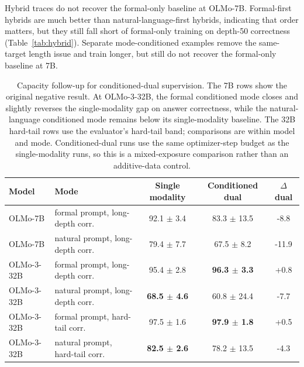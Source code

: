\documentclass[11pt]{article}
\begin{document}
Hybrid traces do not recover the formal-only baseline at OLMo-7B. Formal-first
hybrids are much better than natural-language-first hybrids, indicating that
order matters, but they still fall short of formal-only training on depth-50
correctness (Table~\ref{tab:hybrid}). Separate mode-conditioned examples
remove the same-target length issue and train longer, but still do not recover
the formal-only baseline at 7B.

\begin{table}[t]
\centering
\scriptsize
\begin{tabular}{llccc}
\toprule
Model & Mode & Single modality & Conditioned dual & $\Delta$ dual \\
\midrule
OLMo-7B & formal prompt, long-depth corr. & 92.1 $\pm$ 3.4 & 83.3 $\pm$ 13.5 & -8.8 \\
OLMo-7B & natural prompt, long-depth corr. & 79.4 $\pm$ 7.7 & 67.5 $\pm$ 8.2 & -11.9 \\
\midrule
OLMo-3-32B & formal prompt, long-depth corr. & 95.4 $\pm$ 2.8 & \textbf{96.3 $\pm$ 3.3} & +0.8 \\
OLMo-3-32B & natural prompt, long-depth corr. & \textbf{68.5 $\pm$ 4.6} & 60.8 $\pm$ 24.4 & -7.7 \\
OLMo-3-32B & formal prompt, hard-tail corr. & 97.5 $\pm$ 1.6 & \textbf{97.9 $\pm$ 1.8} & +0.5 \\
OLMo-3-32B & natural prompt, hard-tail corr. & \textbf{82.5 $\pm$ 2.6} & 78.2 $\pm$ 13.5 & -4.3 \\
\bottomrule
\end{tabular}
\caption{Capacity follow-up for conditioned-dual supervision. The 7B rows show
the original negative result. At OLMo-3-32B, the formal conditioned mode closes
and slightly reverses the single-modality gap on answer correctness, while the
natural-language conditioned mode remains below its single-modality baseline.
The 32B hard-tail rows use the evaluator's hard-tail band; comparisons are
within model and mode. Conditioned-dual runs use the same optimizer-step budget
as the single-modality runs, so this is a mixed-exposure comparison rather than
an additive-data control.}
\label{tab:conditioned-capacity}
\end{table}
\end{document}
